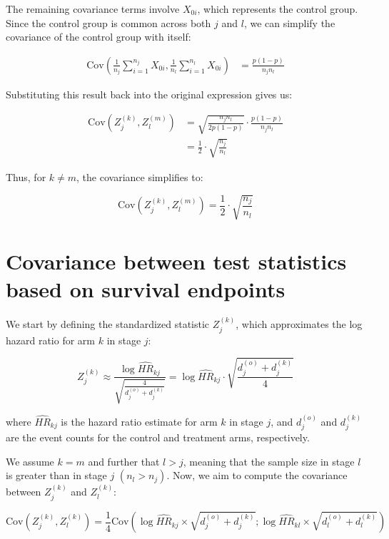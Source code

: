 \documentclass[11pt, a4paper]{article}\usepackage[]{graphicx}\usepackage[]{xcolor}
\begin{document}
{The remaining covariance terms involve \( X_{0i} \), which represents the control group. Since the control group is common across both \( j \) and \( l \), we can simplify the covariance of the control group with itself:

\begin{align*}
\text{Cov}\left( \frac{1}{n_j} \sum_{i=1}^{n_j} X_{0i}, \frac{1}{n_l} \sum_{i=1}^{n_l} X_{0i} \right) &= \frac{p(1-p)}{n_j n_l}
\end{align*}

Substituting this result back into the original expression gives us:

\begin{align*}
\text{Cov}(Z_j^{(k)}, Z_l^{(m)})
&= \sqrt{\frac{n_j n_l}{2p(1-p)}} \cdot \frac{p(1-p)}{n_j n_l} \\
&= \frac{1}{2} \cdot \sqrt{\frac{n_j}{n_l}}
\end{align*}

Thus, for \( k \neq m \), the covariance simplifies to:

\[
\text{Cov}(Z_j^{(k)}, Z_l^{(m)}) = \frac{1}{2} \cdot \sqrt{\frac{n_j}{n_l}}
\]


\section{Covariance between test statistics based on survival endpoints} \label{sec:app_derivations_survival}

We start by defining the standardized statistic \( Z_j^{(k)} \), which approximates the log hazard ratio for arm \( k \) in stage \( j \):

\[
Z_j^{(k)} \approx \frac{\log \widehat{HR}_{kj}}{\sqrt{\frac{4}{d_j^{(o)} + d_j^{(k)}}}} = \log \widehat{HR}_{kj} \cdot \sqrt{\frac{d_j^{(o)} + d_j^{(k)}}{4}}
\]

where \( \widehat{HR}_{kj} \) is the hazard ratio estimate for arm \( k \) in stage \( j \), and \( d_j^{(o)} \) and \( d_j^{(k)} \) are the event counts for the control and treatment arms, respectively.

We assume \( k = m \) and further that \( l > j \), meaning that the sample size in stage \( l \) is greater than in stage \( j \) \( (n_l > n_j) \). Now, we aim to compute the covariance between \( Z_j^{(k)} \) and \( Z_l^{(k)} \):

\[
\text{Cov} \left( Z_j^{(k)} , Z_l^{(k)} \right) = \frac{1}{4} \text{Cov}\left( \log \widehat{HR}_{kj} \times \sqrt{d_j^{(o)} + d_j^{(k)}} ; \log \widehat{HR}_{kl} \times \sqrt{d_l^{(o)} + d_l^{(k)}} \right)
\]


}
\end{document}
